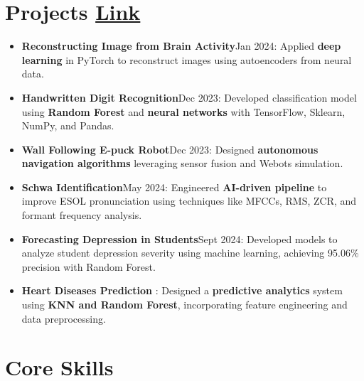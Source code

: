 \documentclass[10 pt, letterpaper]{article}
\begin{document}
\section*{Projects \textbar \href{https://github.com/Seetharamanrs/projects} {Link}}
\begin{itemize}
    \item \textbf{Reconstructing Image from Brain Activity}\textbar Jan 2024: Applied \textbf{deep learning} in PyTorch to reconstruct images using autoencoders from neural data.

    \vspace{-0.23cm}
    \item \textbf{Handwritten Digit Recognition}\textbar Dec 2023: Developed classification model using \textbf{Random Forest} and \textbf{neural networks} with TensorFlow, Sklearn, NumPy, and Pandas.
    \vspace{-0.23cm}
        \item \textbf{Wall Following E-puck Robot}\textbar Dec 2023: Designed \textbf{autonomous navigation algorithms} leveraging sensor fusion and Webots simulation.
    \vspace{-0.23cm}
    \item \textbf{Schwa Identification}\textbar May 2024: Engineered \textbf{AI-driven pipeline} to improve ESOL pronunciation using techniques like MFCCs, RMS, ZCR, and formant frequency analysis.
    \vspace{-0.23cm}
    \item \textbf{Forecasting Depression in Students}\textbar Sept 2024: Developed models to analyze student depression severity using machine learning, achieving 95.06\% precision with Random Forest.
    \vspace{-0.23cm}
    \item \textbf{Heart Diseases Prediction} : Designed a \textbf{predictive analytics} system using \textbf{KNN and Random Forest}, incorporating feature engineering and data preprocessing.
    
\end{itemize}

\section*{Core Skills}
\end{document}
